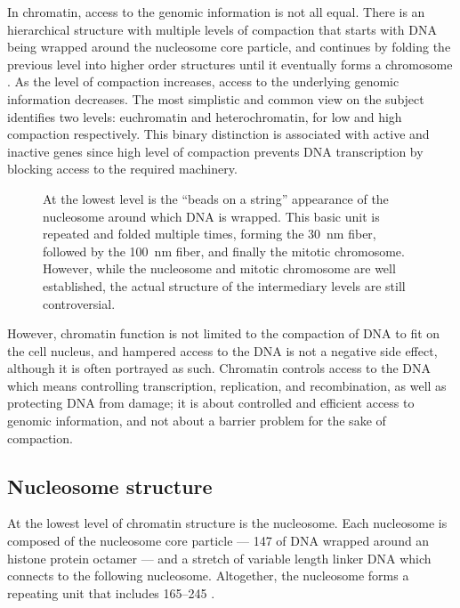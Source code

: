   In chromatin, access to the genomic information is not all equal.
  There is an hierarchical structure with
  multiple levels of compaction that starts with DNA being wrapped
  around the nucleosome core particle, and continues
  by folding the previous level into higher order structures
  until it eventually forms a chromosome .
  As the level of compaction increases, access to the underlying genomic
  information decreases.
  The most simplistic and common view on the subject
  identifies two levels: euchromatin and heterochromatin, for low and
  high compaction respectively.
  This binary distinction is associated with active and inactive genes
  since high level of compaction prevents DNA transcription by blocking
  access to the required machinery.

  \begin{figure}
    \centering
                 {At the lowest level is the ``beads on a string''
                  appearance of the nucleosome around which DNA is
                  wrapped.  This basic unit is repeated and folded
                  multiple times, forming the \SI{30}{\nano\meter}
                  fiber, followed by the \SI{100}{\nano\meter} fiber,
                  and finally the mitotic chromosome.  However, while
                  the nucleosome and mitotic chromosome are well
                  established, the actual structure of the intermediary
                  levels are still controversial.}
    \label{fig:intro:chromatin-structure}
  \end{figure}

  However, chromatin function is not limited to the compaction of DNA
  to fit on the
  cell nucleus, and hampered access to the DNA is not a negative side
  effect, although it is often portrayed as such.
  Chromatin controls access
  to the DNA which means controlling transcription, replication,
  and recombination, as
  well as protecting DNA from damage;  it is about controlled and efficient
  access to genomic information, and not about a barrier problem for the sake
  of compaction.

  \subsection{Nucleosome structure}

    At the lowest level of chromatin structure is the nucleosome.
    Each nucleosome is composed of the nucleosome core particle ---
    \SI{147}{\bp} of DNA wrapped around
    an histone protein octamer ---
    and a stretch of variable length linker DNA which connects
    to the following nucleosome.  Altogether, the nucleosome forms
    a repeating unit that includes \SIrange{165}{245}{\bp}
    \citep{widom1992-linker-length}.

